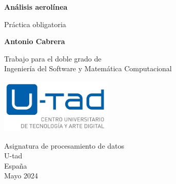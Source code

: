 \documentclass{report}
\begin{document}
\begin{titlepage}
    \begin{center}
        \vspace*{1cm}
 
        \Large\textbf{Análisis aerolínea}
 
        \vspace{0.5cm}
        Práctica obligatoria 
             
        \vspace{1.5cm}
 
        \textbf{Antonio Cabrera}
 
        \vfill
             
        Trabajo para el doble grado de\\
        Ingeniería del Software y Matemática Computacional\\
             
        \vspace{0.8cm}
      
        \includegraphics[width=0.4\textwidth]{figures/logo.png}
             
        Asignatura de procesamiento de datos\\
        U-tad\\
        España\\
        Mayo 2024
             
    \end{center}
 \end{titlepage}

\tableofcontents

\listoffigures


\end{document}
